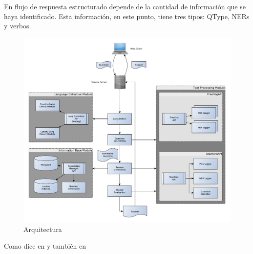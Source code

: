 En flujo de respuesta estructurado depende de la cantidad de
informaci\'on que se haya identificado. Esta informaci\'on, en este
punto, tiene tres tipos: QType, NERs y verbos. 




\begin{figure}
  \centering
    \includegraphics[scale=0.86]{graficos/Architecture}
  \caption{Arquitectura}
  \label{fig:Architecture}
\end{figure}

Como dice en \cite{greenwade93} y también en \cite{RE1}
%
